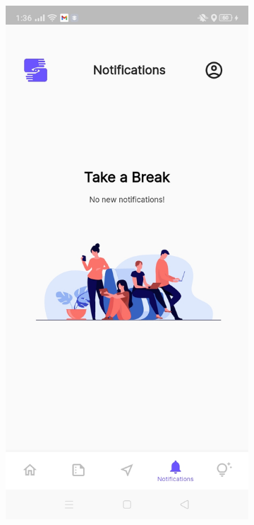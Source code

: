 \begin{figure}[!h]
    \centering
    \begin{subfigure}[c]{0.40\linewidth}
        \centering
        \includegraphics[scale=0.15]{figures/Chapter4/Main/NoNotifications.jpg}

\end{subfigure}
\end{figure}
